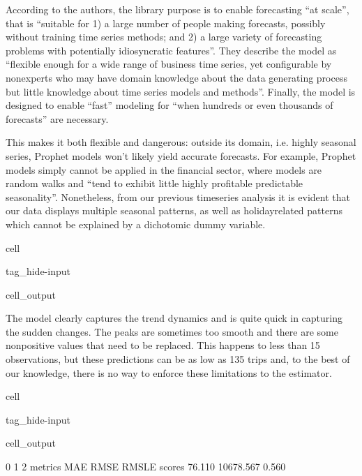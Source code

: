 \documentclass[letterpaper,10pt,english]{jupyterBook}
\begin{document}
\sphinxAtStartPar
According to the authors, the library purpose is to enable forecasting “at scale”, that is “suitable  for  1)  a  large  number  of  people  making  forecasts,  possibly  without  training  time  series  methods;  and  2)  a  large  variety  of  forecasting  problems  with  potentially idiosyncratic features”. They describe the model as “flexible enough for  a  wide  range  of  business  time  series,  yet  configurable  by  non\sphinxhyphen{}experts  who  may  have domain knowledge about the data generating process but little knowledge about time series models and methods”. Finally, the model is designed to enable “fast” modeling for “when hundreds or even thousands of forecasts” are necessary.

\sphinxAtStartPar
This makes it both flexible and dangerous: outside its domain, i.e. highly seasonal series, Prophet models won’t likely yield accurate forecasts. For example, Prophet models simply cannot be applied in the financial sector, where models are random walks and “tend to exhibit little highly profitable predictable seasonality”. Nonetheless, from our previous time\sphinxhyphen{}series analysis it is evident that our data displays multiple seasonal patterns, as well as holiday\sphinxhyphen{}related patterns which cannot be explained by a dichotomic dummy variable.

\begin{sphinxuseclass}{cell}
\begin{sphinxuseclass}{tag_hide-input}
\begin{sphinxuseclass}{cell_output}
\noindent{}

\end{sphinxuseclass}
\end{sphinxuseclass}
\end{sphinxuseclass}
\sphinxAtStartPar
The model clearly captures the trend dynamics and is quite quick in capturing the sudden changes. The peaks are sometimes too smooth and there are some non\sphinxhyphen{}positive values that need to be replaced. This happens to less than 15 observations, but these predictions can be as low as \sphinxhyphen{}135 trips and, to the best of our knowledge, there is no way to enforce these limitations to the estimator.

\begin{sphinxuseclass}{cell}
\begin{sphinxuseclass}{tag_hide-input}
\begin{sphinxuseclass}{cell_output}
\begin{sphinxVerbatim}[commandchars=\\\{\}]
             0         1      2
metrics    MAE      RMSE  RMSLE
scores  76.110 10678.567  0.560
\end{sphinxVerbatim}

\end{sphinxuseclass}
\end{sphinxuseclass}
\end{sphinxuseclass}
\end{document}
